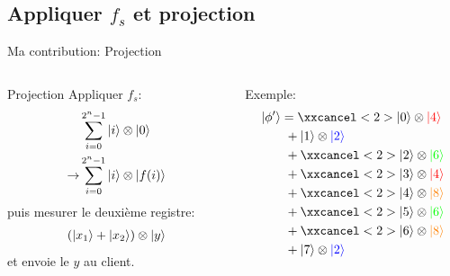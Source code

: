 \documentclass[]{beamer}
\begin{document}
\subsection{Appliquer $f_s$ et projection}
\begin{frame}[label=current]{Ma contribution: Projection}
  \begin{columns}
    \begin{column}{.4\textwidth}
      \begin{block}{Projection}
        Appliquer $f_s$:
        \begin{align*}
          & \sum_{i=0}^{2^n-1} |i\rangle\otimes|0\rangle\\
          \rightarrow & \sum_{i=0}^{2^n-1} |i\rangle\otimes|f(i)\rangle
        \end{align*}
        puis mesurer le deuxième registre:
        \begin{align*}
          (|x_1\rangle + |x_2\rangle)\otimes|y\rangle
        \end{align*}
        et envoie le $y$ au client.
      \end{block}
    \end{column}
    \vrule{}
    \quad
    \begin{column}{.5\textwidth}
      Exemple:
      \begin{align*}
        \ket{\phi'}
        &= \xxcancel<2>{\ket{0}\otimes\textcolor{red}{\ket{4}}}\\
        &~+ \ket{1}\otimes\textcolor{blue}{\ket{2}}\\
        &~+ \xxcancel<2>{\ket{2}\otimes\textcolor{green}{\ket{6}}}\\
        &~+ \xxcancel<2>{\ket{3}\otimes\textcolor{red}{\ket{4}}}\\
        &~+ \xxcancel<2>{\ket{4}\otimes\textcolor{orange}{\ket{8}}}\\
        &~+ \xxcancel<2>{\ket{5}\otimes\textcolor{green}{\ket{6}}}\\
        &~+ \xxcancel<2>{\ket{6}\otimes\textcolor{orange}{\ket{8}}}\\
        &~+ \ket{7}\otimes\textcolor{blue}{\ket{2}}
      \end{align*}
    \end{column}
  \end{columns}
\end{frame}
\end{document}
